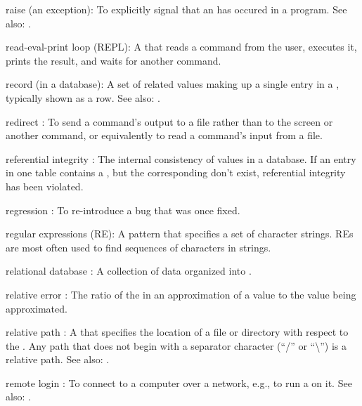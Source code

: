 \documentclass{book}
\begin{document}
\begin{swcdescription}
\item[raise] (an exception):
To explicitly signal that an  has occured in a program.
See also: .

\item[read-eval-print loop] (REPL):
A  that reads a command from the user, executes it, prints the
result, and waits for another command.

\item[record] (in a database):
A set of related values making up a
single entry in a , typically
shown as a row. See also: .

\item[redirect]:
To send a command's output to a file rather than to
the screen or another command, or equivalently to read a command's input
from a file.

\item[referential integrity]:
The internal consistency of values in a
database. If an entry in one table contains a
, but the corresponding
 don't exist, referential integrity
has been violated.

\item[regression]:
To re-introduce a bug that was once fixed.

\item[regular expressions] (RE):
A pattern that specifies a set of
character strings. REs are most often used to find sequences of
characters in strings.

\item[relational database]:
A collection of data organized into
.
 
\item[relative error]:
The ratio of the  in an approximation of a value
to the value being approximated.

\item[relative path]:
A  that specifies the
location of a file or directory with respect to the
. Any
path that does not begin with a separator character (``/'' or
``\textbackslash{}'') is a relative path. See also:
.
 
\item[remote login]:
To connect to a computer over a network,
e.g., to run a  on it.
See also: .


\end{swcdescription}
\end{document}
